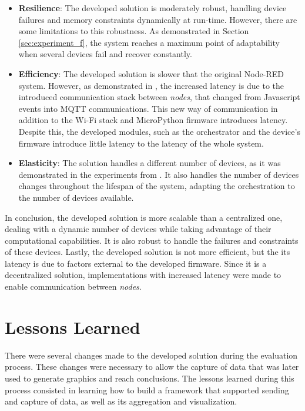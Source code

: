 \begin{itemize}
    \item \textbf{Resilience}: The developed solution is moderately robust, handling device failures and memory constraints dynamically at run-time. However, there are some limitations to this robustness. As demonstrated in Section \ref{sec:experiment_f}, the system reaches a maximum point of adaptability when several devices fail and recover constantly.
    \item \textbf{Efficiency}: The developed solution is slower that the original Node-RED system. However, as demonstrated in , the increased latency is due to the introduced communication stack between \textit{nodes}, that changed from Javascript events into MQTT communications. This new way of communication in addition to the Wi-Fi stack and MicroPython firmware introduces latency. Despite this, the developed modules, such as the orchestrator and the device's firmware introduce little latency to the latency of the whole system.
    \item \textbf{Elasticity}: The solution handles a different number of devices, as it was demonstrated in the experiments from . It also handles the number of devices changes throughout the lifespan of the system, adapting the orchestration to the number of devices available.
\end{itemize}

In conclusion, the developed solution is more scalable than a centralized one, dealing with a dynamic number of devices while taking advantage of their computational capabilities. It is also robust to handle the failures and constraints of these devices. Lastly, the developed solution is not more efficient, but the its latency is due to factors external to the developed firmware. Since it is a decentralized solution, implementations with increased latency were made to enable communication between \textit{nodes}.

\section{Lessons Learned}\label{sec:evaluation_lessons_learned}

There were several changes made to the developed solution during the evaluation process. These changes were necessary to allow the capture of data that was later used to generate graphics and reach conclusions. The lessons learned during this process consisted in learning how to build a framework that supported sending and capture of data, as well as its aggregation and visualization. 

